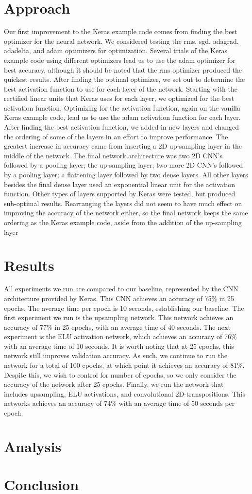 \documentclass{article}
\begin{document}
\section{Approach}
Our first improvement to the Keras example code comes from finding the best optimizer for the neural network. We considered testing the rms, sgd, adagrad, adadelta, and adam optimizers for optimization. Several trials of the Keras example code using different optimizers lead us to use the adam optimizer for best accuracy, although it should be noted that the rms optimizer produced the quickest results. After finding the optimal optimizer, we set out to determine the best activation function to use for each layer of the network. Starting with the rectified linear units that Keras uses for each layer, we optimized for the best activation function. Optimizing for the activation function, again on the vanilla Keras example code, lead us to use the adam activation function for each layer. After finding the best activation function, we added in new layers and changed the ordering of some of the layers in an effort to improve performance. The greatest increase in accuracy came from inserting a 2D up-sampling layer in the middle of the network. 
The final network architecture was two 2D CNN’s followed by a pooling layer; the up-sampling layer; two more 2D CNN’s followed by a pooling layer; a flattening layer followed by two dense layers. All other layers besides the final dense layer used an exponential linear unit for the activation function. Other types of layers supported by Keras were tested, but produced sub-optimal results. Rearranging the layers did not seem to have much effect on improving the accuracy of the network either, so the final network keeps the same ordering as the Keras example code, aside from the addition of the up-sampling layer


\section{Results}
All experiments we run are compared to our baseline, represented by the CNN architecture provided by Keras. This CNN achieves an accuracy of 75\% in 25 epochs. The average time per epoch is 10 seconds, establishing our baseline. The first experiment we run is the upsampling network. This network achieves an accuracy of 77\% in 25 epochs, with an average time of 40 seconds. The next experiment is the ELU activation network, which achieves an accuracy of 76\% with an average time of 10 seconds. It is worth noting that at 25 epochs, this network still improves validation accuracy. As such, we continue to run the network for a total of 100 epochs, at which point it achieves an accuracy of 81\%. Despite this, we wish to control for number of epochs, so we only consider the accuracy of the network after 25 epochs. Finally, we run the network that includes upsampling, ELU activations, and convolutional 2D-transpositions. This networks achieves an accuracy of 74\% with an average time of 50 seconds per epoch.

\section{Analysis}

\section{Conclusion}
\end{document}
